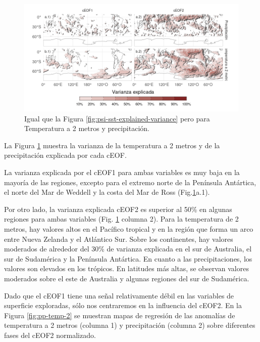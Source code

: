 \documentclass[12pt,oneside,a4paper]{reedthesis}
\begin{document}
\begin{figure}

{\centering \includegraphics{figures/20-ceofs/pp-t2m-r2-1} 

}

\caption{Igual que la Figura \ref{fig:psi-sst-explained-variance} pero para Temperatura a 2 metros y precipitación.}\label{fig:pp-t2m-r2}
\end{figure}



La Figura \ref{fig:pp-t2m-r2} muestra la varianza de la temperatura a 2 metros y de la precipitación explicada por cada cEOF.

La varianza explicada por el cEOF1 para ambas variables es muy baja en la mayoría de las regiones, excepto para el extremo norte de la Península Antártica, el norte del Mar de Weddell y la costa del Mar de Ross (Fig.\ref{fig:pp-t2m-r2}a.1).

Por otro lado, la varianza explicada cEOF2 es superior al 50\% en algunas regiones para ambas variables (Fig. \ref{fig:pp-t2m-r2} columna 2).
Para la temperatura de 2 metros, hay valores altos en el Pacífico tropical y en la región que forma un arco entre Nueva Zelanda y el Atlántico Sur.
Sobre los continentes, hay valores moderados de alrededor del 30\% de varianza explicada en el sur de Australia, el sur de Sudamérica y la Península Antártica.
En cuanto a las precipitaciones, los valores son elevados en los trópicos.
En latitudes más altas, se observan valores moderados sobre el este de Australia y algunas regiones del sur de Sudamérica.

Dado que el cEOF1 tiene una señal relativamente débil en las variables de superficie exploradas, sólo nos centraremos en la influencia del cEOF2.
En la Figura \ref{fig:pp-temp-2} se muestran mapas de regresión de las anomalías de temperatura a 2 metros (columna 1) y precipitación (columna 2) sobre diferentes fases del cEOF2 normalizado.
\end{document}
